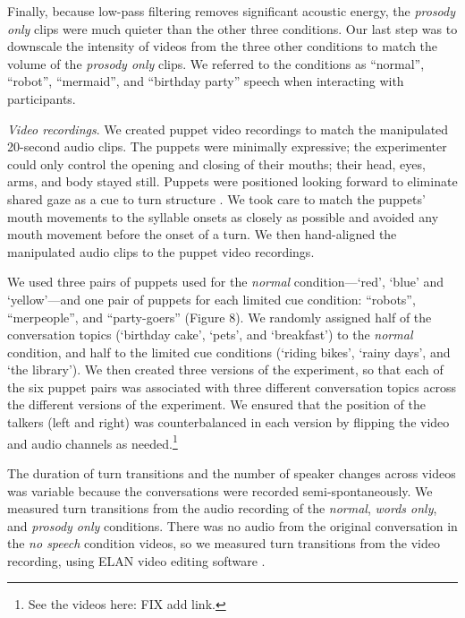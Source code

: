 \documentclass[authoryear, 12pt]{elsarticle}
\begin{document}
Finally, because low-pass filtering removes significant acoustic energy, the \textit{prosody only} clips were much quieter than the other three conditions. Our last step was to downscale the intensity of videos from the three other conditions to match the volume of the \textit{prosody only} clips. We referred to the conditions as ``normal'', ``robot'', ``mermaid'', and ``birthday party'' speech when interacting with participants.

\textit{Video recordings}. We created puppet video recordings to match the manipulated 20-second audio clips. The puppets were minimally expressive; the experimenter could only control the opening and closing of their mouths; their head, eyes, arms, and body stayed still. Puppets were positioned looking forward to eliminate shared gaze as a cue to turn structure \citep{thorgrimssonUndRev}. We took care to match the puppets' mouth movements to the syllable onsets as closely as possible and avoided any mouth movement before the onset of a turn. We then hand-aligned the manipulated audio clips to the puppet video recordings.

We used three pairs of puppets used for the \textit{normal} condition---`red', `blue' and `yellow'---and one pair of puppets for each limited cue condition: ``robots'', ``merpeople'', and ``party-goers'' (Figure 8). We randomly assigned half of the conversation topics (`birthday cake', `pets', and `breakfast') to the \textit{normal} condition, and half to the limited cue conditions (`riding bikes', `rainy days', and `the library'). We then created three versions of the experiment, so that each of the six puppet pairs was associated with three different conversation topics across the different versions of the experiment. We ensured that the position of the talkers (left and right) was counterbalanced in each version by flipping the video and audio channels as needed.\footnote{See the videos here: FIX add link.}

The duration of turn transitions and the number of speaker changes across videos was variable because the conversations were recorded semi-spontaneously. We measured turn transitions from the audio recording of the \textit{normal}, \textit{words only}, and \textit{prosody only} conditions. There was no audio from the original conversation in the \textit{no speech} condition videos, so we measured turn transitions from the video recording, using ELAN video editing software \citep{ELAN}. 
\end{document}
